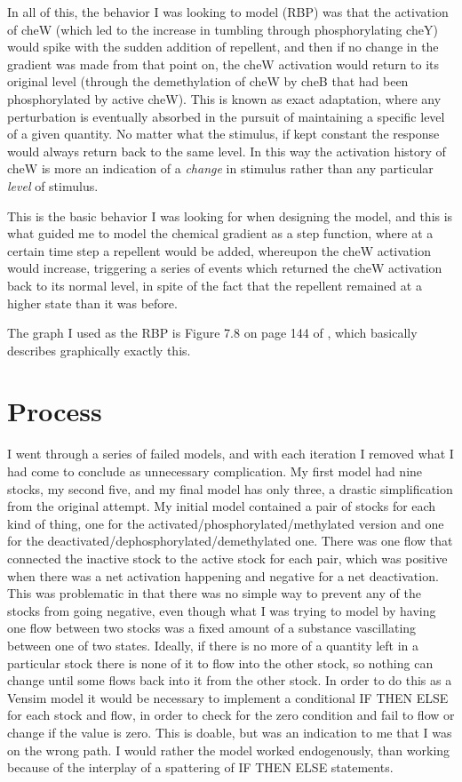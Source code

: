 \documentclass[12pt]{article}
\begin{document}
In all of this, the behavior I was looking to model (RBP) was that the activation of cheW (which led to the increase in tumbling through phosphorylating cheY) would spike with the sudden addition of repellent, and then if no change in the gradient was made from that point on, the cheW activation would return to its original level (through the demethylation of cheW by cheB that had been phosphorylated by active cheW).  This is known as exact adaptation, where any perturbation is eventually absorbed in the pursuit of maintaining a specific level of a given quantity.  No matter what the stimulus, if kept constant the response would always return back to the same level.  In this way the activation history of cheW is more an indication of a {\em change} in stimulus rather than any particular {\em level} of stimulus.  

This is the basic behavior I was looking for when designing the model, and this is what guided me to model the chemical gradient as a step function, where at a certain time step a repellent would be added, whereupon the cheW activation would increase, triggering a series of events which returned the cheW activation back to its normal level, in spite of the fact that the repellent remained at a higher state than it was before.

The graph I used as the RBP is Figure 7.8 on page 144 of \cite{Alon}, which basically describes graphically exactly this.

\section{Process}

I went through a series of failed models, and with each iteration I removed what I had come to conclude as unnecessary complication.  My first model had nine stocks, my second five, and my final model has only three, a drastic simplification from the original attempt.  My initial model contained a pair of stocks for each kind of thing, one for the activated/phosphorylated/methylated version and one for the deactivated/dephosphorylated/demethylated one.  There was one flow that connected the inactive stock to the active stock for each pair, which was positive when there was a net activation happening and negative for a net deactivation.  This was problematic in that there was no simple way to prevent any of the stocks from going negative, even though what I was trying to model by having one flow between two stocks was a fixed amount of a substance vascillating between one of two states.  Ideally, if there is no more of a quantity left in a particular stock there is none of it to flow into the other stock, so nothing can change until some flows back into it from the other stock.  In order to do this as a Vensim model it would be necessary to implement a conditional IF THEN ELSE for each stock and flow, in order to check for the zero condition and fail to flow or change if the value is zero.  This is doable, but was an indication to me that I was on the wrong path.  I would rather the model worked endogenously, than working because of the interplay of a spattering of IF THEN ELSE statements.  
\end{document}
